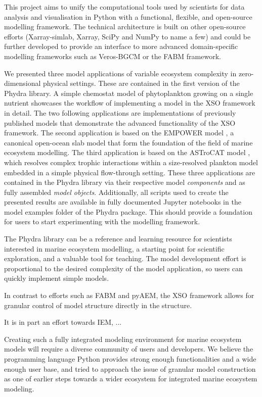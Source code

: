 \documentclass[journal abbreviation, manuscript]{copernicus}
\begin{document}
This project aims to unify the computational tools used by scientists for data analysis and visualisation in Python with a functional, flexible, and open-source modelling framework. The technical architecture is built on other open-source efforts (Xarray-simlab, Xarray, SciPy and NumPy to name a few) and could be further developed to provide an interface to more advanced domain-specific modelling frameworks such as Veros-BGCM or the FABM framework.

We presented three model applications of variable ecosystem complexity in zero-dimensional physical settings. These are contained in the first version of the Phydra library. A simple chemostat model of phytoplankton growing on a single nutrient showcases the workflow of implementing a model in the XSO framework in detail. The two following applications are implementations of previously published models that demonstrate the advanced functionality of the XSO framework. The second application is based on the EMPOWER model \citep{Anderson2015c}, a canonical open-ocean slab model that form the foundation of the field of marine ecosystem modelling. The third application is based on the ASTroCAT model \citep{Banas2011b}, which resolves complex trophic interactions within a size-resolved plankton model embedded in a simple physical flow-through setting. These three applications are contained in the Phydra library via their respective model \textit{components} and as fully assembled \textit{model objects}. Additionally, all scripts used to create the presented results are available in fully documented Jupyter notebooks in the model examples folder of the Phydra package. This should provide a foundation for users to start experimenting with the modelling framework. 

The Phydra library can be a reference and learning resource for scientists interested in marine ecosystem modelling, a starting point for scientific exploration, and a valuable tool for teaching. The model development effort is proportional to the desired complexity of the model application, so users can quickly implement simple models.


In contrast to efforts such as FABM and pyAEM, the XSO framework allows for granular control of model structure directly in the structure.

It is in part an effort towards IEM, ...


Creating such a fully integrated modeling environment for marine ecosystem models will require a diverse community of users and developers. We believe the programming language Python provides strong enough functionalities and a wide enough user base, and tried to approach the issue of granular model construction as one of earlier steps towards a wider ecosystem for integrated marine ecosystem modeling.
\end{document}
